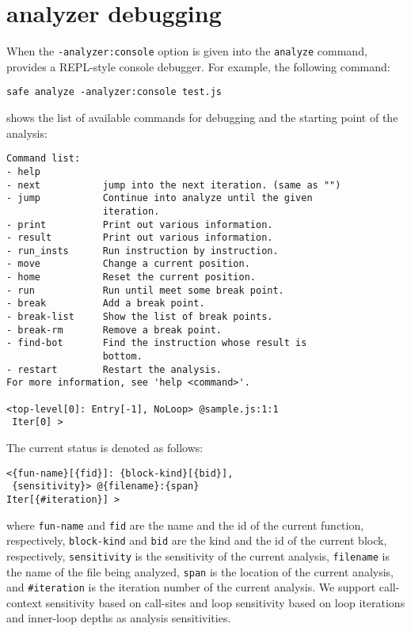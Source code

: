 \section{\safe analyzer debugging}
When the \verb!-analyzer:console! option is given into the \texttt{analyze} command,
\safe provides a REPL-style console debugger.
For example, the following command:
\begin{verbatim}
safe analyze -analyzer:console test.js
\end{verbatim}
shows the list of available commands for debugging and
the starting point of the analysis:
{\small
\begin{verbatim}
Command list:
- help
- next           jump into the next iteration. (same as "")
- jump           Continue into analyze until the given
                 iteration.
- print          Print out various information.
- result         Print out various information.
- run_insts      Run instruction by instruction.
- move           Change a current position.
- home           Reset the current position.
- run            Run until meet some break point.
- break          Add a break point.
- break-list     Show the list of break points.
- break-rm       Remove a break point.
- find-bot       Find the instruction whose result is
                 bottom.
- restart        Restart the analysis.
For more information, see 'help <command>'.

<top-level[0]: Entry[-1], NoLoop> @sample.js:1:1
 Iter[0] >
\end{verbatim}
}

The current status is denoted as follows:
{\small
\begin{verbatim}
<{fun-name}[{fid}]: {block-kind}[{bid}],
 {sensitivity}> @{filename}:{span}
Iter[{#iteration}] >
\end{verbatim}
}
\noindent
where \verb!fun-name! and \verb!fid! are the name and the id of the current function,
respectively, \verb!block-kind! and \verb!bid!
are the kind and the id of the current block, respectively,
\verb!sensitivity! is the sensitivity of the current analysis,
\verb!filename! is the name of the file being analyzed,
\verb!span! is the location of the current analysis, and
\verb!#iteration! is the iteration number of the current analysis.
We support call-context sensitivity based on call-sites
and loop sensitivity based on loop iterations and inner-loop depths
as analysis sensitivities.

